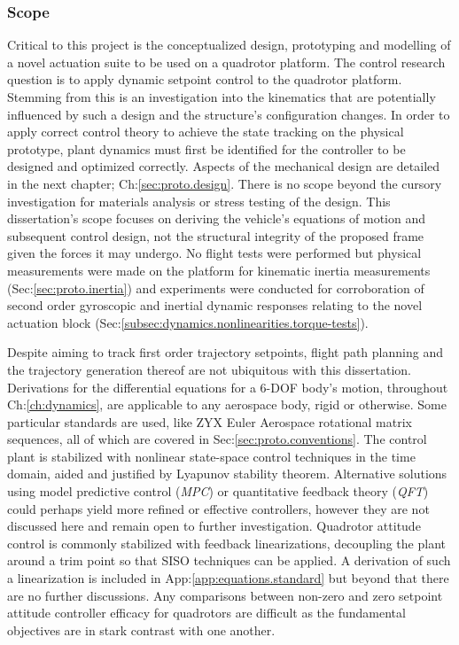 \subsubsection{Scope}
\label{subsubsec:intro.foreword.scope}
Critical to this project is the conceptualized design, prototyping and modelling of a novel actuation suite to be used on a quadrotor platform. The control research question is to apply dynamic setpoint control to the quadrotor platform. Stemming from this is an investigation into the kinematics that are potentially influenced by such a design and the structure's configuration changes. In order to apply correct control theory to achieve the state tracking on the physical prototype, plant dynamics must first be identified for the controller to be designed and optimized correctly. Aspects of the mechanical design are detailed in the next chapter; Ch:\ref{sec:proto.design}. There is no scope beyond the cursory investigation for materials analysis or stress testing of the design. This dissertation's scope focuses on deriving the vehicle's equations of motion and subsequent control design, not the structural integrity of the proposed frame given the forces it may undergo. No flight tests were performed but physical measurements were made on the platform for kinematic inertia measurements (Sec:\ref{sec:proto.inertia}) and experiments were conducted for corroboration of second order gyroscopic and inertial dynamic responses relating to the novel actuation block (Sec:\ref{subsec:dynamics.nonlinearities.torque-tests}).
\par
Despite aiming to track first order trajectory setpoints, flight path planning and the trajectory generation thereof are not ubiquitous with this dissertation. Derivations for the differential equations for a 6-DOF body's motion, throughout Ch:\ref{ch:dynamics}, are applicable to any aerospace body, rigid or otherwise. Some particular standards are used, like ZYX Euler Aerospace rotational matrix sequences, all of which are covered in Sec:\ref{sec:proto.conventions}. The control plant is stabilized with nonlinear state-space control techniques in the time domain, aided and justified by Lyapunov stability theorem\cite{noteonlyapunov,nonlinearsystems,bojelayupanov}. Alternative solutions using model predictive control (\emph{MPC}) or quantitative feedback theory (\emph{QFT}) could perhaps yield more refined or effective controllers, however they are not discussed here and remain open to further investigation. Quadrotor attitude control is commonly stabilized with feedback linearizations, decoupling the plant around a trim point so that SISO techniques can be applied. A derivation of such a linearization is included in App:\ref{app:equations.standard} but beyond that there are no further discussions. Any comparisons between non-zero and zero setpoint attitude controller efficacy for quadrotors are difficult as the fundamental objectives are in stark contrast with one another.
